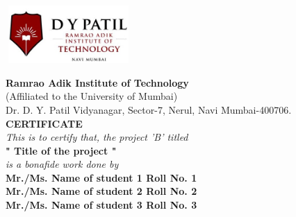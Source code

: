 \begin{center}
    
    \begin{center}
    	\includegraphics[width=48mm, height=22mm,keepaspectratio]{rait_logo}
    \end{center}

{\huge \bf Ramrao Adik Institute of Technology}\\
{\normalsize(Affiliated to the University of Mumbai)}\\
{\normalsize Dr. D. Y. Patil Vidyanagar, Sector-7, Nerul, Navi Mumbai-400706.}\\
\vspace{0.3in}
{\LARGE \bf {CERTIFICATE}}\\
\vspace{0.2in}
{\large\it This is to certify that, the project 'B' titled}\\
\vspace{0.1in}
{\Large \bf " Title of the project "}\\
\vspace{0.1in}
{\large \it is a bonafide work done by}\\
\vspace{0.2in}
{\Large \bf Mr./Ms. Name of student 1 \hspace{0.05in} Roll No. 1}\\
{\Large \bf Mr./Ms. Name of student 2 \hspace{0.15in} Roll No. 2}\\
{\Large \bf Mr./Ms. Name of student 3 \hspace{0.15in} Roll No. 3}\\


\end{center}
